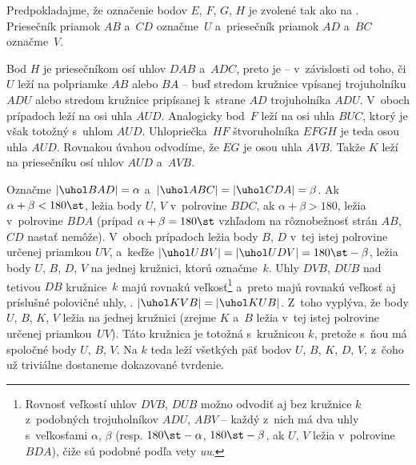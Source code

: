 {%
Predpokladajme, že označenie bodov $E$, $F$, $G$, $H$ je zvolené tak ako na \obr. Priesečník priamok $AB$ a~$CD$ označme~$U$ a~priesečník priamok $AD$ a~$BC$ označme~$V$.

Bod $H$ je priesečníkom osí uhlov $DAB$ a~$ADC$, preto je -- v~závislosti od toho, či $U$ leží na polpriamke $AB$ alebo $BA$ -- buď stredom kružnice vpísanej trojuholníku $ADU$ alebo stredom kružnice pripísanej k~strane $AD$ trojuholníka $ADU$. V~oboch prípadoch leží na osi uhla $AUD$. Analogicky bod~$F$ leží na osi uhla $BUC$, ktorý je však totožný s~uhlom $AUD$. Uhlopriečka~$HF$ štvoruholníka $EFGH$ je teda osou uhla $AUD$. Rovnakou úvahou odvodíme, že $EG$ je osou uhla $AVB$. Takže $K$ leží na priesečníku osí uhlov $AUD$ a~$AVB$.
%

Označme $|\uhol BAD|=\alpha$ a~$|\uhol ABC|=|\uhol CDA|=\beta$. Ak $\alpha+\beta<180\st$, ležia body $U$, $V$ v~polrovine $BDC$, ak $\alpha+\beta>180$, ležia v~polrovine $BDA$ (prípad $\alpha+\beta=180\st$ vzhľadom na rôznobežnosť strán $AB$, $CD$ nastať nemôže). V~oboch prípadoch ležia body $B$, $D$ v~tej istej polrovine určenej priamkou $UV$, a~keďže $|\uhol UBV|=|\uhol UDV|=180\st-\beta$, ležia body $U$, $B$, $D$, $V$ na jednej kružnici, ktorú označme~$k$. Uhly $DVB$, $DUB$ nad tetivou $DB$ kružnice~$k$ majú rovnakú veľkosť\footnote{Rovnosť veľkostí uhlov $DVB$, $DUB$ možno odvodiť aj bez kružnice $k$ z~podobných trojuholníkov $ADU$, $ABV$ -- každý z~nich má dva uhly s~veľkosťami $\alpha$, $\beta$ (resp. $180\st-\alpha$, $180\st-\beta$, ak $U$, $V$ ležia v~polrovine $BDA$), čiže sú podobné podľa vety {\it uu}.} a~preto majú rovnakú veľkosť aj príslušné polovičné uhly, \tj. $|\uhol KVB|=|\uhol KUB|$. Z~toho vyplýva, že body $U$, $B$, $K$, $V$ ležia na jednej kružnici (zrejme $K$ a~$B$ ležia v~tej istej polrovine určenej priamkou~$UV$). Táto kružnica je totožná s~kružnicou $k$, pretože s~ňou má spoločné body $U$, $B$, $V$. Na $k$ teda leží všetkých päť bodov $U$, $B$, $K$, $D$, $V$, z~čoho už triviálne dostaneme dokazované tvrdenie.
}

